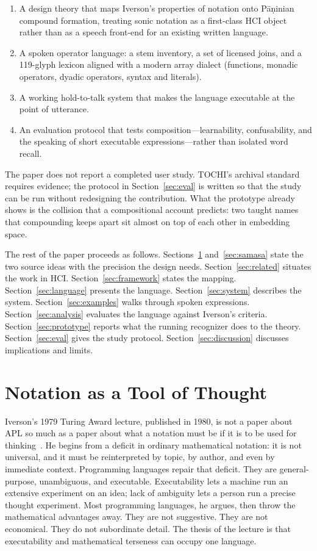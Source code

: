 \documentclass[manuscript, review, anonymous]{acmart}
\begin{document}
\begin{enumerate}
\item A design theory that maps Iverson's properties of notation onto P{\=a}{\d{n}}inian compound formation, treating sonic notation as a first-class HCI object rather than as a speech front-end for an existing written language.
\item A spoken operator language: a stem inventory, a set of licensed joins, and a 119-glyph lexicon aligned with a modern array dialect (functions, monadic operators, dyadic operators, syntax and literals).
\item A working hold-to-talk system that makes the language executable at the point of utterance.
\item An evaluation protocol that tests composition---learnability, confusability, and the speaking of short executable expressions---rather than isolated word recall.
\end{enumerate}

The paper does not report a completed user study. TOCHI's archival standard requires evidence; the protocol in Section~\ref{sec:eval} is written so that the study can be run without redesigning the contribution. What the prototype already shows is the collision that a compositional account predicts: two taught names that compounding keeps apart sit almost on top of each other in embedding space.

The rest of the paper proceeds as follows. Sections~\ref{sec:iverson} and~\ref{sec:samasa} state the two source ideas with the precision the design needs. Section~\ref{sec:related} situates the work in HCI. Section~\ref{sec:framework} states the mapping. Section~\ref{sec:language} presents the language. Section~\ref{sec:system} describes the system. Section~\ref{sec:examples} walks through spoken expressions. Section~\ref{sec:analysis} evaluates the language against Iverson's criteria. Section~\ref{sec:prototype} reports what the running recognizer does to the theory. Section~\ref{sec:eval} gives the study protocol. Section~\ref{sec:discussion} discusses implications and limits.

\section{Notation as a Tool of Thought}
\label{sec:iverson}

Iverson's 1979 Turing Award lecture, published in 1980, is not a paper about APL so much as a paper about what a notation must be if it is to be used for thinking~\cite{Iverson1980Notation}. He begins from a deficit in ordinary mathematical notation: it is not universal, and it must be reinterpreted by topic, by author, and even by immediate context. Programming languages repair that deficit. They are general-purpose, unambiguous, and executable. Executability lets a machine run an extensive experiment on an idea; lack of ambiguity lets a person run a precise thought experiment. Most programming languages, he argues, then throw the mathematical advantages away. They are not suggestive. They are not economical. They do not subordinate detail. The thesis of the lecture is that executability and mathematical terseness can occupy one language.
\end{document}

